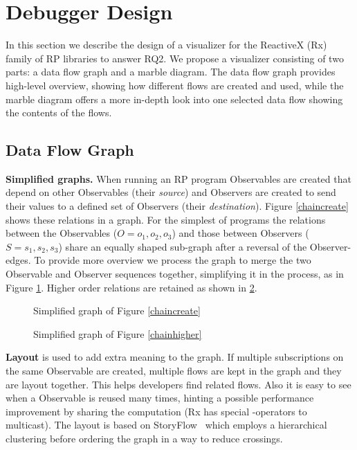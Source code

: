 \section{Debugger Design}
In this section we describe the design of a visualizer for the ReactiveX (Rx) family of RP libraries to answer RQ2. We propose a visualizer consisting of two parts: a data flow graph and a marble diagram. The data flow graph provides high-level overview, showing how different flows are created and used, while the marble diagram offers a more in-depth look into one selected data flow showing the contents of the flows.

\subsection{Data Flow Graph}
\textbf{Simplified graphs.} When running an RP program Observables are created that depend on other Observables (their \textit{source}) and Observers are created to send their values to a defined set of Observers (their \textit{destination}). Figure \ref{chaincreate} shows these relations in a graph. For the simplest of programs the relations between the Observables ($O = {o_1, o_2, o_3}$) and those between Observers ($S = {s_1, s_2, s_3}$) share an equally shaped sub-graph after a reversal of the Observer-edges. To provide more overview we process the graph to merge the two Observable and Observer sequences together, simplifying it in the process, as in Figure \ref{fiddlesimple}. Higher order relations are retained as shown in \ref{fiddlehigher}.

\begin{figure}
	\centering
	
	\caption{Simplified graph of Figure \ref{chaincreate}}
	\label{fiddlesimple}
\end{figure}

\begin{figure}
	\centering
	
	\caption{Simplified graph of Figure \ref{chainhigher}}
	\label{fiddlehigher}
\end{figure}

\textbf{Layout} is used to add extra meaning to the graph. If multiple subscriptions on the same Observable are created, multiple flows are kept in the graph and they are layout together. This helps developers find related flows. Also it is easy to see when a Observable is reused many times, hinting a possible performance improvement by sharing the computation (Rx has special -operators to multicast). The layout is based on StoryFlow~\cite{liu2013storyflow} which employs a hierarchical clustering before ordering the graph in a way to reduce crossings.

